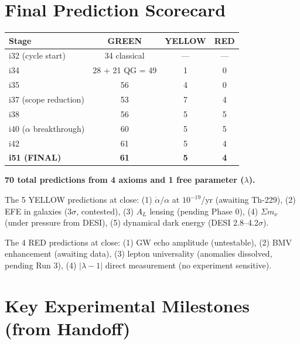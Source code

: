 \documentclass[11pt,a4paper]{article}
\newcommand{\GREEN}{\textcolor{dfdgreen}{\textbf{GREEN}}}
\newcommand{\YELLOW}{\textcolor{dfdyellow}{\textbf{YELLOW}}}
\newcommand{\RED}{\textcolor{dfdred}{\textbf{RED}}}
\begin{document}
\section{Final Prediction Scorecard}
\label{sec:scorecard}

\begin{center}
\begin{tabular}{lccc}
\toprule
\textbf{Stage} & \textbf{\GREEN} & \textbf{\YELLOW} & \textbf{\RED} \\
\midrule
i32 (cycle start) & 34 classical & --- & --- \\
i34 & 28 + 21 QG = 49 & 1 & 0 \\
i35 & 56 & 4 & 0 \\
i37 (scope reduction) & 53 & 7 & 4 \\
i38 & 56 & 5 & 5 \\
i40 ($\alpha$ breakthrough) & 60 & 5 & 5 \\
i42 & 61 & 5 & 4 \\
\textbf{i51 (FINAL)} & \textbf{61} & \textbf{5} & \textbf{4} \\
\bottomrule
\end{tabular}
\end{center}

\textbf{70 total predictions from 4 axioms and 1 free parameter ($\lambda$).}

The 5 YELLOW predictions at close: (1) $\dot\alpha/\alpha$ at $10^{-19}$/yr (awaiting Th-229), (2) EFE in galaxies ($3\sigma$, contested), (3) $A_L$ lensing (pending Phase 0), (4) $\Sigma m_\nu$ (under pressure from DESI), (5) dynamical dark energy (DESI 2.8--4.2$\sigma$).

The 4 RED predictions at close: (1) GW echo amplitude (untestable), (2) BMV enhancement (awaiting data), (3) lepton universality (anomalies dissolved, pending Run 3), (4) $|\lambda - 1|$ direct measurement (no experiment sensitive).

\section{Key Experimental Milestones (from Handoff)}
\label{sec:experiments}
\end{document}

